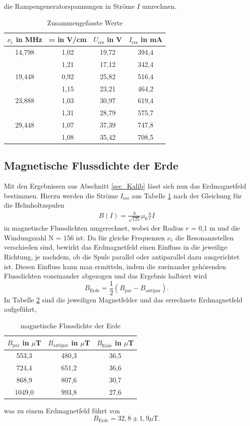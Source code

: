 die Rampengeneratorspannungen in Ströme $I$ umrechnen.
\begin{table}[H]
 \begin{tabular}{c|c|c|c}
  $\nu_e$ in MHz & $m$ in V/cm & $U_\text{res}$ in V & $I_\text{res}$ in mA\\
  \hline
  14,798 & 1,02 & 19,72 & 394,4 \\
  & 1,21&17,12 & 342,4\\
  19,448&0,92 &25,82 & 516,4\\
  &1,15&23,21& 464,2\\
  23,888&1,03&30,97& 619,4\\
  &1,31&28,79&575,7\\
  29,448&1,07&37,39&747,8\\
  &1,08&35,42&708,5\\
 \end{tabular}
\caption{Zusammengefasste Werte}
\label{tab_xAxisKalibTOTAL}
\end{table}

\subsection{Magnetische Flussdichte der Erde}
Mit den Ergebnissen aus Abschnitt \ref{sec_Kalib} lässt sich nun das Erdmagnetfeld bestimmen. Hierzu werden die Ströme $I_\text{res}$ aus Tabelle
\ref{tab_xAxisKalibTOTAL} nach der Gleichung für die Helmholtzspulen 
\begin{align}
B(I)=\frac{8}{\sqrt{125}} \mu_0 \frac{n}{r}I
\end{align}
in magnetische Flussdichten umgerechnet, wobei der Radius
$r$ = 0,1 m und die Windungszahl N = 156 ist. Da für gleiche Frequenzen $\nu_e$ die Resonanzstellen verschieden sind, bewirkt das Erdmagnetfeld einen
Einfluss in die jeweilige Richtung, je nachdem, ob die Spule parallel oder antiparallel dazu ausgerichtet ist. Diesen Einfluss kann man ermitteln,
indem die zueinander gehörenden Flussdichten voneinander abgezogen und das Ergebnis halbiert wird
\begin{equation}
 B_\text{Erde} = \frac12 ( B_\text{par} - B_\text{antipar}).
\end{equation}
In Tabelle \ref{tab_erdMagnetfeld} sind die jeweiligen Magnetfelder und das errechnete Erdmagnetfeld aufgeführt,
\begin{table}[H]
 \begin{tabular}{c|c|c}
 $B_\text{par}$ in $\mu$T & $B_\text{antipar}$ in $\mu$T& $B_\text{Erde}$ in $\mu$T\\
 \hline
 553,3 &	480,3&	36,5\\
724,4&	651,2&	36,6 \\
868,9&	807,6&	30,7\\
1049,0&	993,8&	27,6\\
 \end{tabular}
\caption{magnetische Flussdichte der Erde}
\label{tab_erdMagnetfeld}
\end{table}
was zu einem Erdmagnetfeld führt von 
\begin{equation}
 B_\text{Erde} = 32,8 \pm 1,9 \mu\text{T}.
\end{equation}

